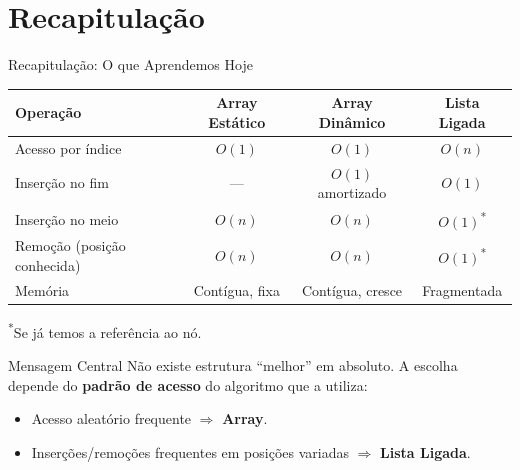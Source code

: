 \documentclass[aspectratio=169]{beamer}
\begin{document}
\section{Recapitulação}

\begin{frame}[shrink]{Recapitulação: O que Aprendemos Hoje}
    \centering
    \renewcommand{\arraystretch}{1.3}
    \small
    \begin{tabular}{@{} l c c c @{}}
        \hline
        \textbf{Operação} & \textbf{Array Estático} & \textbf{Array Dinâmico} & \textbf{Lista Ligada} \\
        \hline
        Acesso por índice & $O(1)$ & $O(1)$ & $O(n)$ \\
        Inserção no fim & --- & $O(1)$ amortizado & $O(1)$ \\
        Inserção no meio & $O(n)$ & $O(n)$ & $O(1)$\textsuperscript{*} \\
        Remoção (posição conhecida) & $O(n)$ & $O(n)$ & $O(1)$\textsuperscript{*} \\
        Memória & Contígua, fixa & Contígua, cresce & Fragmentada \\
        \hline
    \end{tabular}

    {\scriptsize \textsuperscript{*}Se já temos a referência ao nó.}

    \vspace{0.4cm}
    \begin{block}{Mensagem Central}
        Não existe estrutura ``melhor'' em absoluto. A escolha depende do \textbf{padrão de acesso} do algoritmo que a utiliza:
        \begin{itemize}
            \item Acesso aleatório frequente $\Rightarrow$ \textbf{Array}.
            \item Inserções/remoções frequentes em posições variadas $\Rightarrow$ \textbf{Lista Ligada}.
        \end{itemize}
    \end{block}
\end{frame}
\end{document}
